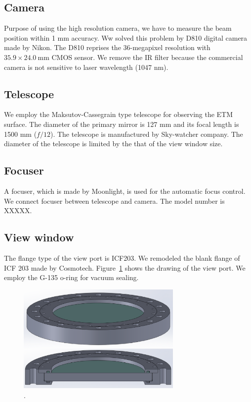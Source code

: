 \subsection{Camera}
Purpose of using the high resolution camera, we have to measure the beam position within 1 mm accuracy. Ww solved this problem by D810 digital camera made by Nikon. The D810 reprises the 36-megapixel resolution with $35.9 \times 24.0~\mathrm{mm}$ CMOS sensor. We remove the IR filter because the commercial camera is not sensitive to laser wavelength (1047 nm).
\subsection{Telescope}
We employ the Maksutov-Cassegrain type telescope for observing the ETM surface. The diameter of the primary mirror is 127 mm and its focal length is 1500 mm ($f/12$). The telescope is manufactured by Sky-watcher company. The diameter of the telescope is limited by the that of the view window size. 
\subsection{Focuser}
A focuser, which is made by Moonlight, is used for the automatic focus control. 
We connect focuser between telescope and camera. The model number is XXXXX.
\subsection{View window}
The flange type of the view port is ICF203. We remodeled the blank flange of ICF 203 made by Cosmotech. Figure~\ref{fig:Camera_window} shows the drawing of the view port. We employ the G-135 o-ring for vacuum sealing. 

\begin{figure}
\begin{center}
\includegraphics[width=8cm]{Figures/Camera_view_window.eps}
\caption{.} 
\label{fig:Camera_window} 
\end{center}
\end{figure}

